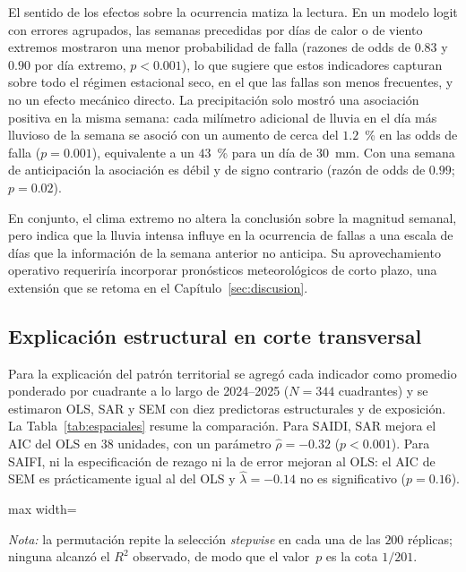 El sentido de los efectos sobre la ocurrencia matiza la lectura. En un modelo logit con errores agrupados, las semanas precedidas por días de calor o de viento extremos mostraron una menor probabilidad de falla (razones de odds de $0{.}83$ y $0{.}90$ por día extremo, $p<0{.}001$), lo que sugiere que estos indicadores capturan sobre todo el régimen estacional seco, en el que las fallas son menos frecuentes, y no un efecto mecánico directo. La precipitación solo mostró una asociación positiva en la misma semana: cada milímetro adicional de lluvia en el día más lluvioso de la semana se asoció con un aumento de cerca del $1{.}2$~\% en las odds de falla ($p=0{.}001$), equivalente a un $43$~\% para un día de $30$~mm. Con una semana de anticipación la asociación es débil y de signo contrario (razón de odds de $0{.}99$; $p=0{.}02$).

En conjunto, el clima extremo no altera la conclusión sobre la magnitud semanal, pero indica que la lluvia intensa influye en la ocurrencia de fallas a una escala de días que la información de la semana anterior no anticipa. Su aprovechamiento operativo requeriría incorporar pronósticos meteorológicos de corto plazo, una extensión que se retoma en el Capítulo~\ref{sec:discusion}.

\subsection{Explicación estructural en corte transversal}
\label{sec:resultados_corte_transversal}

Para la explicación del patrón territorial se agregó cada indicador como promedio ponderado por cuadrante a lo largo de 2024--2025 ($N=344$ cuadrantes) y se estimaron OLS, SAR y SEM con diez predictoras estructurales y de exposición. La Tabla~\ref{tab:espaciales} resume la comparación. Para SAIDI, SAR mejora el AIC del OLS en $38$ unidades, con un parámetro $\hat\rho=-0{.}32$ ($p<0{.}001$). Para SAIFI, ni la especificación de rezago ni la de error mejoran al OLS: el AIC de SEM es prácticamente igual al del OLS y $\hat\lambda=-0{.}14$ no es significativo ($p=0{.}16$).

\begin{table}[!htbp]
\centering
\small
\caption{Modelos de corte transversal ($N=344$): comparación OLS, SAR y SEM y validación espacial}
\label{tab:espaciales}
\begin{adjustbox}{max width=\linewidth}

\end{adjustbox}

\vspace{2pt}
\noindent\footnotesize\textit{Nota:} la permutación repite la selección \emph{stepwise} en cada una de las $200$ réplicas; ninguna alcanzó el $R^2$ observado, de modo que el valor~$p$ es la cota $1/201$.
\end{table}

